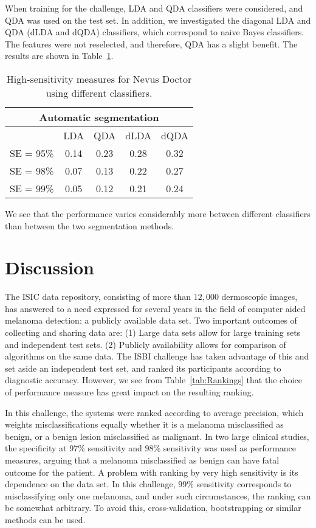 \documentclass[a4paper,12pt]{article}
\begin{document}
When training for the challenge, LDA and QDA classifiers were considered, and QDA was used on the test set. 
In addition, we investigated the diagonal LDA and QDA (dLDA and dQDA) classifiers, which correspond to naive Bayes classifiers. 
The features were not reselected, and therefore, QDA has a slight benefit. 
The results are shown in Table~\ref{tab:Diagonal}. 
\begin{table}
\begin{tabular}{c | c | c | c | c}
        \multicolumn{5}{c}{Automatic segmentation} \\
        \hline
        & LDA & QDA & dLDA & dQDA \\
        \hline
   SE = 95\% & 0.14 & 0.23 & 0.28 &0.32\\
  SE = 98\% & 0.07 & 0.13 & 0.22 & 0.27 \\
  SE = 99\% & 0.05 & 0.12 & 0.21 & 0.24 
\end{tabular}
  \caption{High-sensitivity measures for Nevus Doctor using different classifiers.}
  \label{tab:Diagonal}
\end{table}
We see that the performance varies considerably more between different classifiers than between the two segmentation methods. 

\section{Discussion} \label{sec:Discussion} %

The ISIC data repository, consisting of more than $12,000$ dermoscopic images, has answered to a need expressed for several years in the field of computer aided melanoma detection: a publicly available data set. 
Two important outcomes of collecting and sharing data are: 
(1) Large data sets allow for large training sets and independent test sets. (2) Publicly availability allows for comparison of algorithms on the same data.
The ISBI challenge has taken advantage of this and set aside an independent test set, and ranked its participants according to diagnostic accuracy. 
However, we see from Table~\ref{tab:Rankings} that the choice of performance measure has great impact on the resulting ranking. 

In this challenge, the systems were ranked according to average precision, which weights misclassifications equally whether it is a melanoma misclassified as benign, or a benign lesion misclassified as malignant. 
In two large clinical studies, the specificity at $97\%$ sensitivity \citep{Malvehy2014Clinical} and $98\%$ sensitivity \citep{Monheit2011Performance} was used as performance measures, arguing that a melanoma misclassified as benign can have fatal outcome for the patient. 
A problem with ranking by very high sensitivity is its dependence on the data set. 
In this challenge, $99\%$ sensitivity corresponds to misclassifying only one melanoma, and under such circumstances, the ranking can be somewhat arbitrary. 
To avoid this, cross-validation, bootstrapping or similar methods can be used.   
\end{document}

